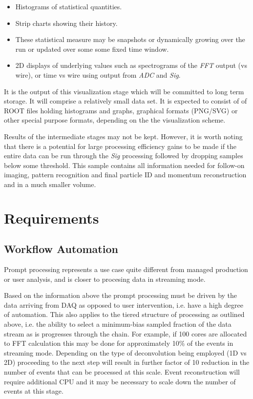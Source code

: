 \documentclass[pdftex,12pt,letter]{article}
\begin{document}
\begin{itemize}
\item Histograms of statistical quantities.
\item Strip charts showing their history.
\item These statistical measure may be snapshots or dynamically
  growing over the run or updated over some some fixed time window.
\item 2D displays of underlying values such as spectrograms of the \textit{FFT}
  output (vs wire), or time vs wire using output from \textit{ADC} and \textit{Sig}.
\end{itemize}


\noindent It is the output of this visualization stage which will be
committed to long term storage.  It will comprise a relatively small
data set.  It is expected to consist of of ROOT files holding
histograms and graphs, graphical formats (PNG/SVG) or other special
purpose formats, depending on the the visualization scheme.

Results of the intermediate stages may not be kept.  However, it is
worth noting that there is a potential for large processing efficiency
gains to be made if the entire data can be run through the
\textit{Sig} processing followed by dropping samples below some
threshold.  This sample contains all information needed for follow-on
imaging, pattern recognition and final particle ID and momentum
reconstruction and in a much smaller volume.

\section{Requirements}

\subsection{Workflow Automation}

Prompt processing represents a use case quite different from managed production or user analysis, and is closer to
procesing data in streaming mode.

Based on the information above the prompt processing must be driven by the data arriving from DAQ as opposed to user intervention, i.e. have a high degree
of automation. This also applies to the tiered structure of processing as outlined above, i.e. the ability to select a minimum-bias sampled fraction of the data stream as is progresses
through the chain. For example, if 100 cores are allocated to FFT calculation this may be done for approximately 10\% of the events in streaming mode.
Depending on the type of deconvolution being employed (1D vs 2D) proceeding to the next step will result in further factor of 10 reduction in the number of
events that can be processed at this scale. Event reconstruction will require additional CPU and it may be necessary to scale down the number of
events at this stage.
\end{document}
